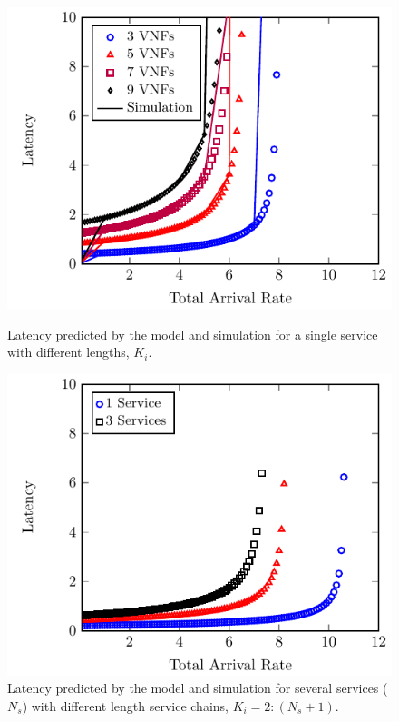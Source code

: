 
\begin{figure}

	\begin{minipage}[b]{.49\textwidth}
		\includegraphics[width=\linewidth]{graphs/diff_lengths}
		\caption{Latency predicted by the model and simulation for a single service with different lengths, $K_i$.}
		\label{fig:length_chain}
	\end{minipage}
	\hfill
	\begin{minipage}[b]{.49\textwidth}
		\includegraphics[width=\linewidth]{graphs/mult_services}
		\caption{Latency predicted by the model and simulation for several services ($N_s$)
			with different length service chains, $K_i = 2:(N_s+1)$.}
		\label{fig:mult_services}
	\end{minipage}


\end{figure}
